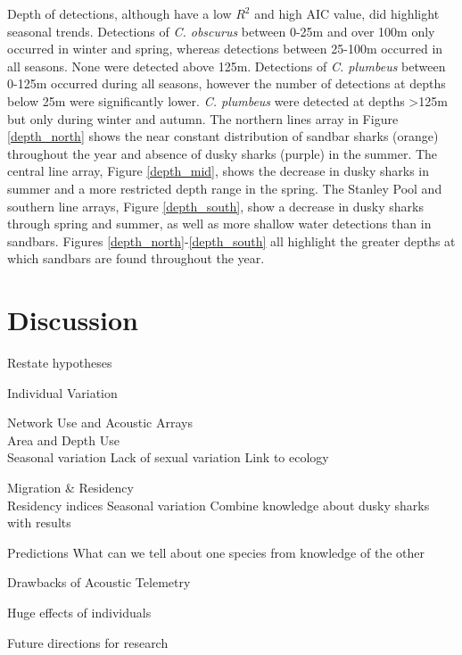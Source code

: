 \documentclass[11pt,a4paper]{article}
\begin{document}
	\noindent Depth of detections, although have a low $R^2$ and high AIC value, did highlight seasonal trends. Detections of \textit{C. obscurus} between 0-25m and over 100m only occurred in winter and spring, whereas detections between 25-100m occurred in all seasons. None were detected above 125m. Detections of \textit{C. plumbeus} between 0-125m occurred during all seasons, however the number of detections at depths below 25m were significantly lower. \textit{C. plumbeus} were detected at depths \textgreater125m but only during winter and autumn. The northern lines array in Figure \ref{depth_north} shows the near constant distribution of sandbar sharks (orange) throughout the year and absence of dusky sharks (purple) in the summer. The central line array, Figure \ref{depth_mid}, shows the decrease in dusky sharks in summer and a more restricted depth range in the spring. The Stanley Pool and southern line arrays, Figure \ref{depth_south}, show a decrease in dusky sharks through spring and summer, as well as more shallow water detections than in sandbars. Figures \ref{depth_north}-\ref{depth_south} all highlight the greater depths at which sandbars are found throughout the year.
	
	
	
	\newpage
	
	\section{Discussion}
	
	Restate hypotheses
	
	Individual Variation
	
	Network Use and Acoustic Arrays\\
	
	Area and Depth Use\\
	
		Seasonal variation
		Lack of sexual variation
		Link to ecology
		
	
	Migration \& Residency\\
	
		Residency indices
		Seasonal variation
		Combine knowledge about dusky sharks with results
	
	Predictions
		What can we tell about one species from knowledge of the other
		
	Drawbacks of Acoustic Telemetry
	
	Huge effects of individuals 

	Future directions for research
\end{document}
